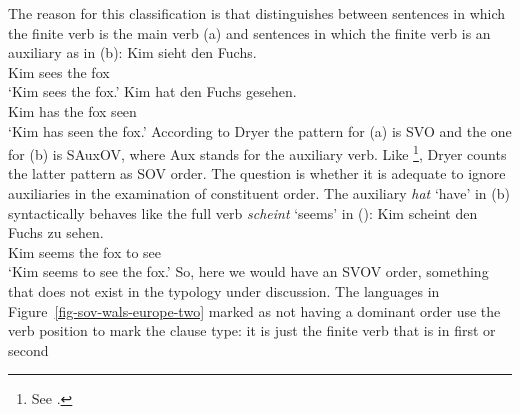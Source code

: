 The reason for this classification is that \citet[Section~1]{Dryer2013c} distinguishes between sentences in which the finite
verb is the main verb (a) and sentences in which the finite verb is an auxiliary as in (b):
\eal
\ex 
\gll Kim sieht den Fuchs.\\
     Kim sees the fox\\
\glt `Kim sees the fox.'
\ex
\gll Kim hat den Fuchs gesehen.\\
     Kim has the fox seen\\
\glt `Kim has seen the fox.'
\zl
According to Dryer the pattern for (a) is SVO and the one for (b) is SAuxOV, where Aux
stands for the auxiliary verb. Like
\citet{Greenberg63a-u}\footnote{%
  See .
}, Dryer counts the latter pattern as SOV order. The question is whether it is adequate to ignore auxiliaries
in the examination of constituent order. The auxiliary \emph{hat} `have' in (b) syntactically
behaves like the full verb \emph{scheint} `seems' in ():
\ea
\gll Kim scheint den Fuchs zu sehen.\\
     Kim seems   the fox  to see\\
\glt `Kim seems to see the fox.'
\z
So, here we would have an SVOV order, something that does not exist in the typology under discussion.
The languages in Figure~\ref{fig-sov-wals-europe-two} marked as not having a dominant order use the
verb position to mark the clause type: it is just the finite verb that is in first or second
